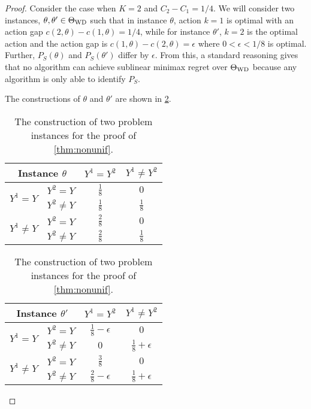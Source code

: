 \begin{proof}
Consider the case when $K=2$ and $C_2 - C_1 = 1/4$. 
We will consider two instances, $\theta,\theta'\in \Theta_{\mathrm{WD}}$ such that in instance $\theta$, 
action $k=1$ is optimal with an action gap $c(2,\theta) - c(1,\theta) = 1/4$, 
while for instance $\theta'$, $k=2$ is the optimal action and the action gap is $c(1,\theta) - c(2,\theta) = \epsilon$
where $0<\epsilon<1/8$ is optimal.
Further, $P_S(\theta)$ and $P_S(\theta')$ differ by $\epsilon$. 
From this, a standard reasoning gives that no algorithm can achieve sublinear minimax regret over $\Theta_{\mathrm{WD}}$ because any
algorithm is only able to identify $P_S$. 

The constructions of $\theta$ and $\theta'$ are shown in \cref{tab:nonunif}.
\bgroup
\def\arraystretch{1.5}
\begin{table}[]
\centering
\begin{tabular}{|c|c|c|c|}
\hline
\multicolumn{2}{|c|}{Instance $\theta$}  & $Y^1=Y^2$     & $Y^1\ne Y^2$  \\ \hline
\multirow{2}{*}{$Y^1= Y$}   & $Y^2= Y$   & $\frac{1}{8}$ & $0$           \\ \cline{2-4} 
                            & $Y^2\ne Y$ & $\frac{1}{8}$ & $\frac{1}{8}$ \\ \hline
\multirow{2}{*}{$Y^1\ne Y$} & $Y^2= Y$   & $\frac{2}{8}$ & $0$           \\ \cline{2-4} 
                            & $Y^2\ne Y$ & $\frac{2}{8}$ & $\frac{1}{8}$ \\ \hline
\end{tabular}
\begin{tabular}{|c|c|c|c|}
\hline
\multicolumn{2}{|c|}{Instance $\theta'$}  & $Y^1=Y^2$     & $Y^1\ne Y^2$  \\ \hline
\multirow{2}{*}{$Y^1= Y$}   & $Y^2= Y$   & $\frac{1}{8}-\epsilon$ & $0$           \\ \cline{2-4} 
                            & $Y^2\ne Y$ & $0$ & $\frac{1}{8}+\epsilon$ \\ \hline
\multirow{2}{*}{$Y^1\ne Y$} & $Y^2= Y$   & $\frac{3}{8}$ & $0$           \\ \cline{2-4} 
                            & $Y^2\ne Y$ & $\frac{2}{8}-\epsilon$ & $\frac{1}{8}+\epsilon$ \\ \hline
\end{tabular}

\label{tab:nonunif}
\vspace*{0.1in}

\caption{The construction of two problem instances for the proof of \cref{thm:nonunif}.}
\end{table}
\egroup
\end{proof}
